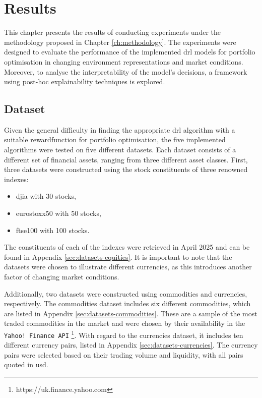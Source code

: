 \chapter{Results} \label{ch:results}

This chapter presents the results of conducting experiments under the methodology proposed in Chapter \ref{ch:methodology}. The experiments were designed to evaluate the performance of the implemented \acrshort{drl} models for portfolio optimisation in changing environment representations and market conditions. Moreover, to analyse the interpretability of the model's decisions, a framework using post-hoc explainability techniques is explored.

\section{Dataset} \label{sec:dataset}

Given the general difficulty in finding the appropriate \acrshort{drl} algorithm with a suitable \gls{rewardfunction} for portfolio optimisation, the five implemented algorithms were tested on five different datasets. Each dataset consists of a different set of financial assets, ranging from three different asset classes. First, three datasets were constructed using the stock constituents of three renowned indexes:
\begin{itemize}
    \item \acrfull{djia} with 30 stocks,
    \item \acrfull{eurostoxx50} with 50 stocks,
    \item \acrfull{ftse100} with 100 stocks.
\end{itemize}

The constituents of each of the indexes were retrieved in April 2025 and can be found in Appendix \ref{sec:datasets-equities}. It is important to note that the datasets were chosen to illustrate different currencies, as this introduces another factor of changing market conditions. 

Additionally, two datasets were constructed using commodities and currencies, respectively. The commodities dataset includes six different commodities, which are listed in Appendix \ref{sec:datasets-commodities}. These are a sample of the most traded commodities in the market and were chosen by their availability in the \texttt{Yahoo! Finance API} \footnote{https://uk.finance.yahoo.com}. With regard to the currencies dataset, it includes ten different currency pairs, listed in Appendix \ref{sec:datasets-currencies}. The currency pairs were selected based on their trading volume and liquidity, with all pairs quoted in \acrfull{usd}.

